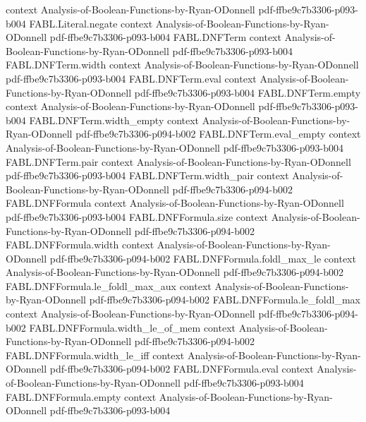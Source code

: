 \begin{theorem}
  {context}
  {Analysis-of-Boolean-Functions-by-Ryan-ODonnell}
  {pdf-ffbe9c7b3306-p093-b004}
\proofstep
  {FABL.Literal.negate}
  {context}
  {Analysis-of-Boolean-Functions-by-Ryan-ODonnell}
  {pdf-ffbe9c7b3306-p093-b004}
\proofstep
  {FABL.DNFTerm}
  {context}
  {Analysis-of-Boolean-Functions-by-Ryan-ODonnell}
  {pdf-ffbe9c7b3306-p093-b004}
\proofstep
  {FABL.DNFTerm.width}
  {context}
  {Analysis-of-Boolean-Functions-by-Ryan-ODonnell}
  {pdf-ffbe9c7b3306-p093-b004}
\proofstep
  {FABL.DNFTerm.eval}
  {context}
  {Analysis-of-Boolean-Functions-by-Ryan-ODonnell}
  {pdf-ffbe9c7b3306-p093-b004}
\proofstep
  {FABL.DNFTerm.empty}
  {context}
  {Analysis-of-Boolean-Functions-by-Ryan-ODonnell}
  {pdf-ffbe9c7b3306-p093-b004}
\proofstep
  {FABL.DNFTerm.width_empty}
  {context}
  {Analysis-of-Boolean-Functions-by-Ryan-ODonnell}
  {pdf-ffbe9c7b3306-p094-b002}
\proofstep
  {FABL.DNFTerm.eval_empty}
  {context}
  {Analysis-of-Boolean-Functions-by-Ryan-ODonnell}
  {pdf-ffbe9c7b3306-p093-b004}
\proofstep
  {FABL.DNFTerm.pair}
  {context}
  {Analysis-of-Boolean-Functions-by-Ryan-ODonnell}
  {pdf-ffbe9c7b3306-p093-b004}
\proofstep
  {FABL.DNFTerm.width_pair}
  {context}
  {Analysis-of-Boolean-Functions-by-Ryan-ODonnell}
  {pdf-ffbe9c7b3306-p094-b002}
\proofstep
  {FABL.DNFFormula}
  {context}
  {Analysis-of-Boolean-Functions-by-Ryan-ODonnell}
  {pdf-ffbe9c7b3306-p093-b004}
\proofstep
  {FABL.DNFFormula.size}
  {context}
  {Analysis-of-Boolean-Functions-by-Ryan-ODonnell}
  {pdf-ffbe9c7b3306-p094-b002}
\proofstep
  {FABL.DNFFormula.width}
  {context}
  {Analysis-of-Boolean-Functions-by-Ryan-ODonnell}
  {pdf-ffbe9c7b3306-p094-b002}
\proofstep
  {FABL.DNFFormula.foldl_max_le}
  {context}
  {Analysis-of-Boolean-Functions-by-Ryan-ODonnell}
  {pdf-ffbe9c7b3306-p094-b002}
\proofstep
  {FABL.DNFFormula.le_foldl_max_aux}
  {context}
  {Analysis-of-Boolean-Functions-by-Ryan-ODonnell}
  {pdf-ffbe9c7b3306-p094-b002}
\proofstep
  {FABL.DNFFormula.le_foldl_max}
  {context}
  {Analysis-of-Boolean-Functions-by-Ryan-ODonnell}
  {pdf-ffbe9c7b3306-p094-b002}
\proofstep
  {FABL.DNFFormula.width_le_of_mem}
  {context}
  {Analysis-of-Boolean-Functions-by-Ryan-ODonnell}
  {pdf-ffbe9c7b3306-p094-b002}
\proofstep
  {FABL.DNFFormula.width_le_iff}
  {context}
  {Analysis-of-Boolean-Functions-by-Ryan-ODonnell}
  {pdf-ffbe9c7b3306-p094-b002}
\proofstep
  {FABL.DNFFormula.eval}
  {context}
  {Analysis-of-Boolean-Functions-by-Ryan-ODonnell}
  {pdf-ffbe9c7b3306-p093-b004}
\proofstep
  {FABL.DNFFormula.empty}
  {context}
  {Analysis-of-Boolean-Functions-by-Ryan-ODonnell}
  {pdf-ffbe9c7b3306-p093-b004}
\proofstep

\end{theorem}

